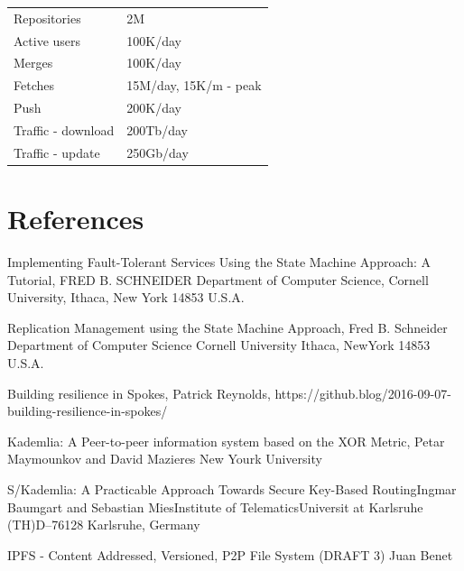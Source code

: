\documentclass[12pt,oneside]{article}
\begin{document}
\begin{tabular}{ll}
  Repositories & 2M \\
  Active users & 100K/day \\
  Merges & 100K/day \\
  Fetches & 15M/day, 15K/m - peak \\
  Push & 200K/day \\
  Traffic - download & 200Tb/day \\
  Traffic - update & 250Gb/day \\
\end{tabular}

\section{References}
\label{ref:references}

Implementing Fault-Tolerant Services Using the State Machine Approach: A Tutorial, FRED B. SCHNEIDER Department of Computer Science, Cornell University, Ithaca, New York 14853 U.S.A.

Replication Management using the State Machine Approach, Fred B. Schneider Department of Computer Science Cornell University Ithaca, NewYork 14853 U.S.A.

Building resilience in Spokes, Patrick Reynolds, https://github.blog/2016-09-07-building-resilience-in-spokes/

Kademlia: A Peer-to-peer information system based on the XOR Metric, Petar Maymounkov and David Mazieres New Yourk University

S/Kademlia: A Practicable Approach Towards Secure Key-Based RoutingIngmar Baumgart and Sebastian MiesInstitute of TelematicsUniversit at Karlsruhe (TH)D–76128 Karlsruhe, Germany

IPFS - Content Addressed, Versioned, P2P File System (DRAFT 3) Juan Benet

\printbibliography
\end{document}

